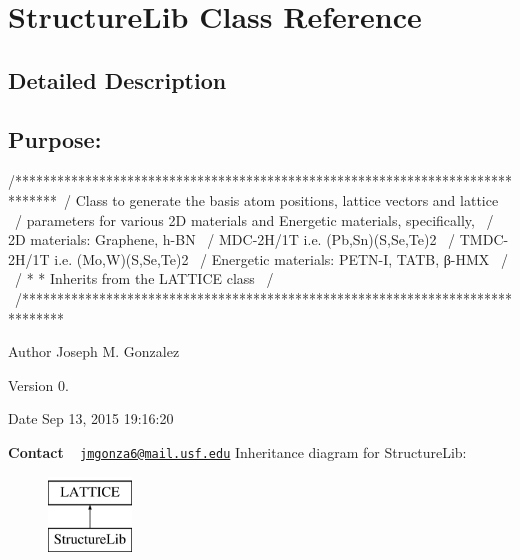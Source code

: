 \hypertarget{class_structure_lib}{}\section{Structure\+Lib Class Reference}
\label{class_structure_lib}


\subsection{Detailed Description}
\subsection*{{\bfseries Purpose\+:} }

\begin{DoxyVerb}/******************************************************************************\
/  Class to generate the basis atom positions, lattice vectors and lattice     \
/  parameters for various 2D materials  and Energetic materials, specifically, \
/  2D materials: Graphene, h-BN                                                \
/                MDC-2H/1T i.e.  (Pb,Sn)(S,Se,Te)2                             \
/                TMDC-2H/1T i.e. (Mo,W)(S,Se,Te)2                              \
/  Energetic materials: PETN-I, TATB, β-HMX                                    \
/                                                                              \
/  * * Inherits from the LATTICE class                                         \
/                                                                              \ 
/******************************************************************************\
\end{DoxyVerb}


\begin{DoxyAuthor}{Author}
Joseph M. Gonzalez
\end{DoxyAuthor}
\begin{DoxyVersion}{Version}
0.\+3
\end{DoxyVersion}
\begin{DoxyDate}{Date}
Sep 13, 2015 19\+:16\+:20
\end{DoxyDate}
{\bfseries Contact} ~\newline
 \href{mailto:jmgonza6@mail.usf.edu}{\tt jmgonza6@mail.\+usf.\+edu} Inheritance diagram for Structure\+Lib\+:\begin{figure}[H]
\begin{center}
\leavevmode
\includegraphics[height=2.000000cm]{class_structure_lib}
\end{center}
\end{figure}
